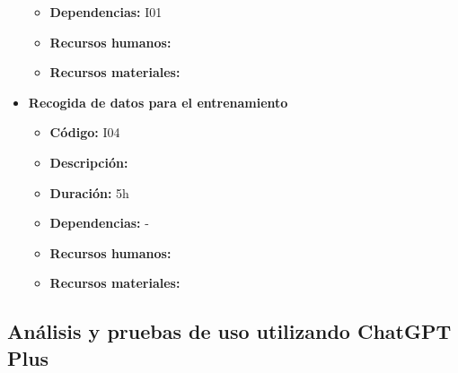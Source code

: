 \begin{itemize}
\begin{itemize}
            \item \textbf{Dependencias:} I01
            \item \textbf{Recursos humanos:}
            \item \textbf{Recursos materiales:}
        \end{itemize}
    \item \textbf{Recogida de datos para el entrenamiento}
        \begin{itemize}
            \item \textbf{Código:} I04
            \item \textbf{Descripción:}
            \item \textbf{Duración:} 5h
            \item \textbf{Dependencias:} -
            \item \textbf{Recursos humanos:}
            \item \textbf{Recursos materiales:}
        \end{itemize}
\end{itemize}

\subsection{Análisis y pruebas de uso utilizando ChatGPT Plus}
\label{subsec:tareas_ichatgpt}

